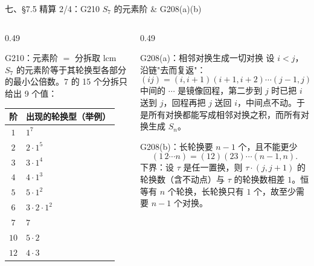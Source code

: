 \documentclass[aspectratio=169,10pt,fontset=none]{ctexbeamer}
\begin{document}
\begin{frame}[t]{七、\S7.5 精算 2/4：G210 $S_7$ 的元素阶 \& G208(a)(b)}
  \begin{columns}[T,onlytextwidth]
    \begin{column}{0.49\textwidth}
      \begin{block}{\footnotesize G210：元素阶 $=$ 分拆取 lcm}
        \scriptsize
        $S_7$ 的元素阶等于其轮换型各部分的最小公倍数。$7$ 的 15 个分拆只给出 9 个值：
        \begin{center}
          \renewcommand{\arraystretch}{1.1}
          \begin{tabular}{@{}c l@{}}
            \toprule
            阶 & 出现的轮换型（举例）\\
            \midrule
            $1$ & $1^7$\\
            $2$ & $2\cdot1^5$\\
            $3$ & $3\cdot1^4$\\
            $4$ & $4\cdot1^3$\\
            $5$ & $5\cdot1^2$\\
            $6$ & $3\cdot2\cdot1^2$\\
            $7$ & $7$\\
            $10$ & $5\cdot2$\\
            $12$ & $4\cdot3$\\
            \bottomrule
          \end{tabular}
        \end{center}
      \end{block}
    \end{column}
    \begin{column}{0.49\textwidth}
      \begin{block}{\footnotesize G208(a)：相邻对换生成一切对换}
        \scriptsize
        设 $i<j$，沿链"去而复返"：
        \[ (ij)=(i,i+1)(i+1,i+2)\cdots(j-1,j)\cdots(i+1,i+2)(i,i+1). \]
        中间的 $\cdots$ 是镜像回程，第二步到 $j$ 时已把 $i$ 送到 $j$，回程再把 $j$ 送回 $i$，中间点不动。于是所有对换都能写成相邻对换之积，而所有对换生成 $S_n$。
      \end{block}
      \begin{exampleblock}{\footnotesize G208(b)：长轮换要 $n-1$ 个，且不能更少}
        \scriptsize
        \[ (1\,2\cdots n)=(12)(23)\cdots(n-1,n). \]
        下界：设 $\tau$ 是任一置换，则 $\tau\cdot(j,j+1)$ 的轮换数（含不动点）与 $\tau$ 的轮换数相差 $1$。恒等有 $n$ 个轮换，长轮换只有 $1$ 个，故至少需要 $n-1$ 个对换。
      \end{exampleblock}
    \end{column}
  \end{columns}
\end{frame}
\end{document}
